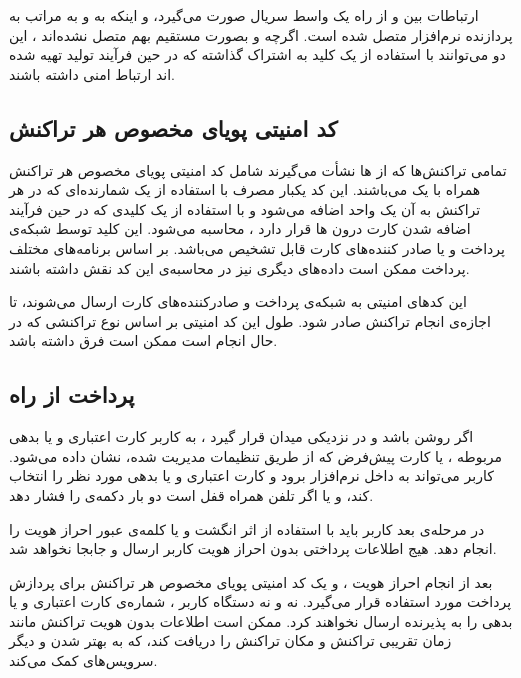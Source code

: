 \documentclass[oneside]{report}
\begin{document}
ارتباطات بین 
{\normalsize {}}
 و
 {\normalsize {}}
  از راه یک واسط سریال صورت می‌گیرد، و اینکه 
  {\normalsize {}} 
  به 
  {\normalsize {}}
  و به مراتب به پردازنده نرم‌افزار متصل شده است. اگرچه 
  {\normalsize {}}
  و
  {\normalsize {}}
  بصورت مستقیم بهم متصل نشده‌اند ، این دو می‌توانند با استفاده‌ از یک کلید به اشتراک گذاشته که در حین فرآیند تولید تهیه شده اند ارتباط امنی داشته باشند. 
   	      				 
  \subsection{کد امنیتی پویای مخصوص هر تراکنش  } 	      			
تمامی تراکنش‌ها که از 
  {\normalsize {}} ها
  نشأت می‌گیرند شامل کد امنیتی پویای مخصوص هر تراکنش 
   همراه با یک 
     {\normalsize {}}
     می‌باشند. این کد یکبار مصرف با استفاده از یک شمارنده‌ای که در هر تراکنش به آن یک واحد اضافه می‌شود  و با استفاده از یک کلیدی که در حین فرآیند اضافه شدن کارت درون 
       {\normalsize {}}ها
       قرار دارد ، محاسبه می‌شود. این کلید توسط شبکه‌ی 	پرداخت و یا صادر کننده‌های کارت قابل تشخیص می‌باشد. بر اساس برنامه‌های مختلف پرداخت ممکن است داده‌های دیگری نیز در محاسبه‌ی این کد نقش داشته باشند. 
       
       این کدهای امنیتی به شبکه‌ی پرداخت و صادرکننده‌های کارت ارسال می‌شوند، تا اجازه‌ی انجام تراکنش صادر شود. طول این کد امنیتی بر اساس نوع تراکنشی که در حال انجام است ممکن است فرق داشته باشد. 
       
 \subsection{پرداخت از راه {\small {}} }
 اگر 
 {\normalsize {}}
 روشن باشد و در نزدیکی میدان 
 {\normalsize {}}
 قرار گیرد ، به کاربر کارت اعتباری و یا بدهی مربوطه ، یا کارت پیش‌فرض که از طریق تنظیمات مدیریت شده، نشان داده می‌شود. 
 کاربر می‌تواند به داخل نرم‌افزار 
 {\normalsize {}} 
 برود و کارت اعتباری و یا بدهی مورد نظر را انتخاب کند، و یا اگر تلفن همراه قفل است دو بار دکمه‌ی 
 {\normalsize {}} 
 را فشار دهد. 
 
 در مرحله‌ی بعد کاربر باید با استفاده از اثر انگشت و یا کلمه‌ی عبور احراز هویت را انجام دهد. هیج اطلاعات پرداختی بدون احراز هویت کاربر ارسال و جابجا نخواهد شد. 
 
 بعد از انجام احراز هویت ، 
 {\normalsize {}} 
 و یک  کد امنیتی پویای مخصوص هر تراکنش برای پردازش پرداخت مورد استفاده قرار می‌گیرد. نه 
  {\normalsize {}}
  و نه دستگاه کاربر ، شماره‌ی کارت اعتباری و یا بدهی را به پذیرنده ارسال نخواهند کرد. 
   {\normalsize {}}
   ممکن است اطلاعات بدون هویت تراکنش مانند زمان تقریبی تراکنش و مکان تراکنش را دریافت کند، که به بهتر شدن 
    {\normalsize {}} 
    و دیگر سرویس‌های 
     {\normalsize {}} 
     کمک می‌کند.  
   
\end{document}
